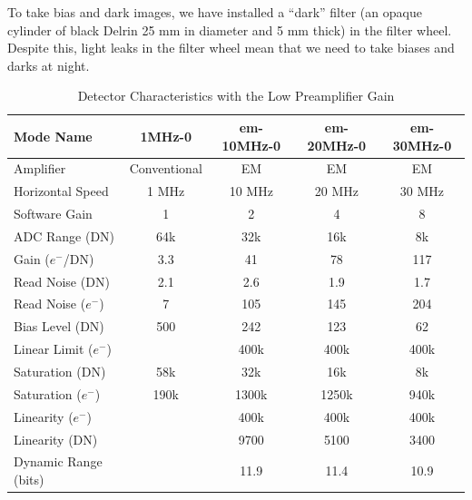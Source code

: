 To take bias and dark images, we have installed a “dark” filter (an opaque cylinder of black Delrin 25 mm in diameter and 5 mm thick) in the filter wheel. Despite this, light leaks in the filter wheel mean that we need to take biases and darks at night.

\begin{table}
    \centering
    \begin{tabular}{lcccc}
    \hline
    Mode Name&1MHz-0&em-10MHz-0&em-20MHz-0&em-30MHz-0\\
    \hline
    Amplifier&Conventional&EM&EM&EM\\
    Horizontal Speed&1 MHz&10 MHz&20 MHz&30 MHz\\
    Software Gain&1&2&4&8\\
    ADC Range (DN)&64k&32k&16k&8k\\
    Gain ($e^-$/DN)&3.3&41&78&117\\
    Read Noise (DN)&2.1&2.6&1.9&1.7\\
    Read Noise ($e^-$)&7&105&145&204\\
    Bias Level (DN)&500&242&123&62\\
    Linear Limit ($e^-$)&&400k&400k&400k\\
    Saturation (DN)&58k&32k&16k&8k\\
    Saturation ($e^-$)&190k&1300k&1250k&940k\\
    Linearity ($e^-$)&&400k&400k&400k\\
    Linearity (DN)&&9700&5100&3400\\
    Dynamic Range (bits)&&11.9&11.4&10.9\\
    \hline
    \end{tabular}
    \caption{Detector Characteristics with the Low Preamplifier Gain}
    \label{table:detector-characteristics-low-gain}
\end{table}

